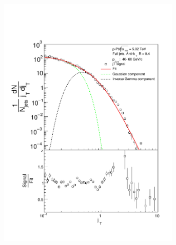 \begin{appendices}
\begin{figure}
\begin{subfigure}{0.24\textwidth}
\end{subfigure}
\begin{subfigure}{0.24\textwidth}
\includegraphics[width=0.95\textwidth]{results/JetConejTSignalFit/JetConejTSignalFitNFin00JetPt04perconeBgBayes}
\end{subfigure}
\begin{subfigure}{0.24\textwidth}

\end{subfigure}
\end{figure}
\end{appendices}
